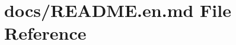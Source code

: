 \hypertarget{_r_e_a_d_m_e_8en_8md}{}\section{docs/\+R\+E\+A\+D\+ME.en.\+md File Reference}
\label{_r_e_a_d_m_e_8en_8md}
